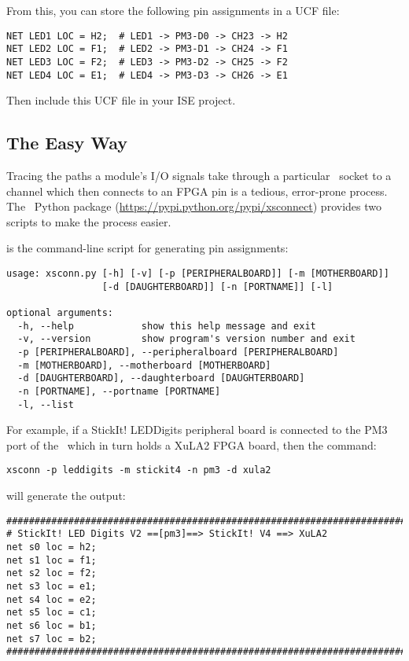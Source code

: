 \documentclass[letterpaper,11pt,oneside]{memoir}
\begin{document}
From this, you can store the following pin assignments in a UCF file:

\begin{lstlisting}
NET LED1 LOC = H2;  # LED1 -> PM3-D0 -> CH23 -> H2
NET LED2 LOC = F1;  # LED2 -> PM3-D1 -> CH24 -> F1
NET LED3 LOC = F2;  # LED3 -> PM3-D2 -> CH25 -> F2
NET LED4 LOC = E1;  # LED4 -> PM3-D3 -> CH26 -> E1
\end{lstlisting}

Then include this UCF file in your ISE project.


\subsection{The Easy Way}

Tracing the paths a module's I/O signals take through a particular \digpmod\
socket to a channel which then connects to an FPGA pin is a tedious, error-prone process.
The \pgm{xsconnect}\ Python package (\url{https://pypi.python.org/pypi/xsconnect})
provides two scripts to make the process easier.

 is the command-line script for generating pin assignments:

\begin{lstlisting}
usage: xsconn.py [-h] [-v] [-p [PERIPHERALBOARD]] [-m [MOTHERBOARD]]
                 [-d [DAUGHTERBOARD]] [-n [PORTNAME]] [-l]

optional arguments:
  -h, --help            show this help message and exit
  -v, --version         show program's version number and exit
  -p [PERIPHERALBOARD], --peripheralboard [PERIPHERALBOARD]
  -m [MOTHERBOARD], --motherboard [MOTHERBOARD]
  -d [DAUGHTERBOARD], --daughterboard [DAUGHTERBOARD]
  -n [PORTNAME], --portname [PORTNAME]
  -l, --list
\end{lstlisting}
      
For example, if a StickIt! LEDDigits peripheral board is connected to
the PM3 port of the \product\ which in turn holds a XuLA2 FPGA board, 
then the command:

\begin{lstlisting}
xsconn -p leddigits -m stickit4 -n pm3 -d xula2
\end{lstlisting}
    
will generate the output:

\begin{lstlisting}
########################################################################
# StickIt! LED Digits V2 ==[pm3]==> StickIt! V4 ==> XuLA2
net s0 loc = h2;
net s1 loc = f1;
net s2 loc = f2;
net s3 loc = e1;
net s4 loc = e2;
net s5 loc = c1;
net s6 loc = b1;
net s7 loc = b2;
########################################################################
\end{lstlisting}
\end{document}
